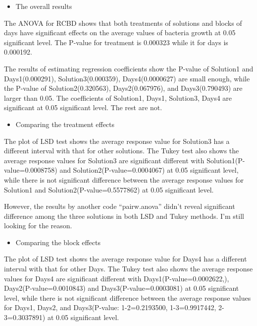 \documentclass[]{article}
\providecommand{\tightlist}{%
  \setlength{\itemsep}{0pt}\setlength{\parskip}{0pt}}
\begin{document}
\begin{itemize}
\tightlist
\item
  The overall results
\end{itemize}

The ANOVA for RCBD shows that both treatments of solutions and blocks of
days have significant effects on the average values of bacteria growth
at 0.05 significant level. The P-value for treatment is 0.000323 while
it for days is 0.000192.

The results of estimating regression coefficients show the P-value of
Solution1 and Days1(0.000291), Solution3(0.000359), Days4(0.0000627) are
small enough, while the P-value of Solution2(0.320563), Days2(0.067976),
and Days3(0.790493) are larger than 0.05. The coefficients of Solution1,
Days1, Solution3, Days4 are significant at 0.05 significant level. The
rest are not.

\begin{itemize}
\tightlist
\item
  Comparing the treatment effects
\end{itemize}

The plot of LSD test shows the average response value for Solution3 has
a different interval with that for other solutions. The Tukey test also
shows the average response values for Solution3 are significant
different with Solution1(P-value=0.0008758) and
Solution2(P-value=0.0004067) at 0.05 significant level, while there is
not significant difference between the average response values for
Solution1 and Solution2(P-value=0.5577862) at 0.05 significant level.

However, the results by another code ``pairw.anova'' didn't reveal
significant difference among the three solutions in both LSD and Tukey
methods. I'm still looking for the reason.

\begin{itemize}
\tightlist
\item
  Comparing the block effects
\end{itemize}

The plot of LSD test shows the average response value for Days4 has a
different interval with that for other Days. The Tukey test also shows
the average response values for Days4 are significant different with
Days1(P-value=0.0002622,), Days2(P-value=0.0010843) and
Days3(P-value=0.0003081) at 0.05 significant level, while there is not
significant difference between the average response values for Days1,
Days2, and Days3(P-value: 1-2=0.2193500, 1-3=0.9917442, 2-3=0.3037891)
at 0.05 significant level.
\end{document}
